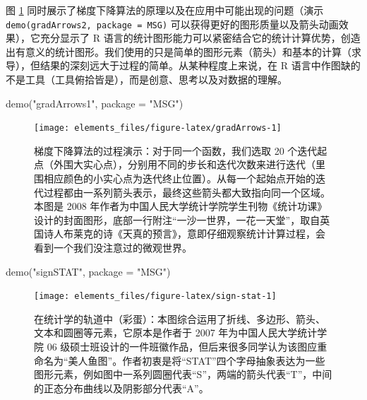 \documentclass[
  b5paper,
  UTF8,twoside]{book}
\newenvironment{Shaded}{\begin{snugshade}}{\end{snugshade}}
\newcommand{\AttributeTok}[1]{\textcolor[rgb]{0.77,0.63,0.00}{#1}}
\newcommand{\FunctionTok}[1]{\textcolor[rgb]{0.00,0.00,0.00}{#1}}
\newcommand{\NormalTok}[1]{#1}
\newcommand{\StringTok}[1]{\textcolor[rgb]{0.31,0.60,0.02}{#1}}
\begin{document}
图 \ref{fig:gradArrows} 同时展示了梯度下降算法的原理以及在应用中可能出现的问题（演示 \texttt{demo(\textquotesingle{}gradArrows2\textquotesingle{},\ package\ =\ \textquotesingle{}MSG\textquotesingle{})} 可以获得更好的图形质量以及箭头动画效果），它充分显示了 R 语言的统计图形能力可以紧密结合它的统计计算优势，创造出有意义的统计图形。我们使用的只是简单的图形元素（箭头）和基本的计算（求导），但结果的深刻远大于过程的简单。从某种程度上来说，在 R 语言中作图缺的不是工具（工具俯拾皆是），而是创意、思考以及对数据的理解。

\begin{Shaded}
\begin{Highlighting}[]
\FunctionTok{demo}\NormalTok{(}\StringTok{"gradArrows1"}\NormalTok{, }\AttributeTok{package =} \StringTok{"MSG"}\NormalTok{)}
\end{Highlighting}
\end{Shaded}

\begin{figure}

{\centering \texttt{[image: elements\_files/figure-latex/gradArrows-1]} 

}

\caption[ 梯度下降算法的过程演示 ]{梯度下降算法的过程演示：对于同一个函数，我们选取 20 个迭代起点（外围大实心点），分别用不同的步长和迭代次数来进行迭代（里围相应颜色的小实心点为迭代终止位置）。从每一个起始点开始的迭代过程都由一系列箭头表示，最终这些箭头都大致指向同一个区域。本图是 2008 年作者为中国人民大学统计学院学生刊物《统计功课》设计的封面图形，底部一行附注``一沙一世界，一花一天堂''，取自英国诗人布莱克的诗《天真的预言》，意即仔细观察统计计算过程，会看到一个我们没注意过的微观世界。}\label{fig:gradArrows}
\end{figure}



\begin{Shaded}
\begin{Highlighting}[]
\FunctionTok{demo}\NormalTok{(}\StringTok{"signSTAT"}\NormalTok{, }\AttributeTok{package =} \StringTok{"MSG"}\NormalTok{)}
\end{Highlighting}
\end{Shaded}

\begin{figure}

{\centering \texttt{[image: elements\_files/figure-latex/sign-stat-1]} 

}

\caption[ 在统计学的轨道中（彩蛋）]{在统计学的轨道中（彩蛋）：本图综合运用了折线、多边形、箭头、文本和圆圈等元素，它原本是作者于 2007 年为中国人民大学统计学院 06 级硕士班设计的一件班徽作品，但后来很多同学认为该图应重命名为``美人鱼图''。作者初衷是将``STAT''四个字母抽象表达为一些图形元素，例如图中一系列圆圈代表``S''，两端的箭头代表``T''，中间的正态分布曲线以及阴影部分代表``A''。}\label{fig:sign-stat}
\end{figure}
\end{document}
